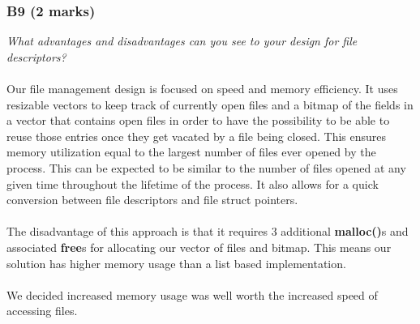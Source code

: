 \documentclass{report}
\newcommand{\question}[1]{\textit{#1} \ }
\newcommand{\fun}[1]{\textcolor{Emerald}{\textbf{#1}}}
\begin{document}
            \subsubsection*{B9 (2 marks)}
                \question{What advantages and disadvantages can you see to your design for file descriptors?}
								\\
								\\ Our file management design is focused on speed and memory efficiency. It uses resizable vectors to
								keep track of currently open files and a bitmap of the fields in a vector that contains open files
								in order to have the possibility to be able to reuse those entries once they get vacated by a file being closed. This ensures
								memory utilization equal to the largest number of files ever opened by the process. This can be expected to be similar
								to the number of files opened at any given time throughout the lifetime of the process. It also allows for a
								quick conversion between file descriptors and file struct pointers.
								\\
								\\ The disadvantage of this approach is that it requires 3 additional \fun{malloc()}s and associated \fun{free}s for allocating our vector of files and bitmap. 
                                This means our solution has higher memory usage than a list based implementation.
                                \\
                                \\ We decided increased memory usage was well worth the increased speed of accessing files.
\end{document}
